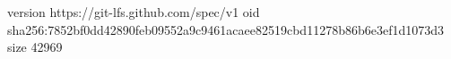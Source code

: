 version https://git-lfs.github.com/spec/v1
oid sha256:7852bf0dd42890feb09552a9c9461acaee82519cbd11278b86b6e3ef1d1073d3
size 42969
